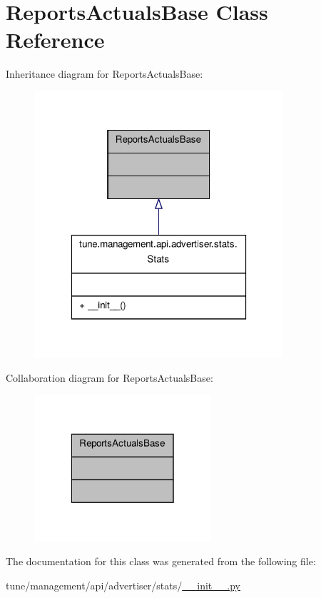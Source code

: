 \hypertarget{classReportsActualsBase}{\section{Reports\-Actuals\-Base Class Reference}
\label{classReportsActualsBase}
}


Inheritance diagram for Reports\-Actuals\-Base\-:
\nopagebreak
\begin{figure}[H]
\begin{center}
\leavevmode
\includegraphics[width=262pt]{classReportsActualsBase__inherit__graph}
\end{center}
\end{figure}


Collaboration diagram for Reports\-Actuals\-Base\-:
\nopagebreak
\begin{figure}[H]
\begin{center}
\leavevmode
\includegraphics[width=186pt]{classReportsActualsBase__coll__graph}
\end{center}
\end{figure}


The documentation for this class was generated from the following file\-:\begin{DoxyCompactItemize}
\item 
tune/management/api/advertiser/stats/\hyperlink{management_2api_2advertiser_2stats_2____init_____8py}{\-\_\-\-\_\-init\-\_\-\-\_\-.\-py}\end{DoxyCompactItemize}
